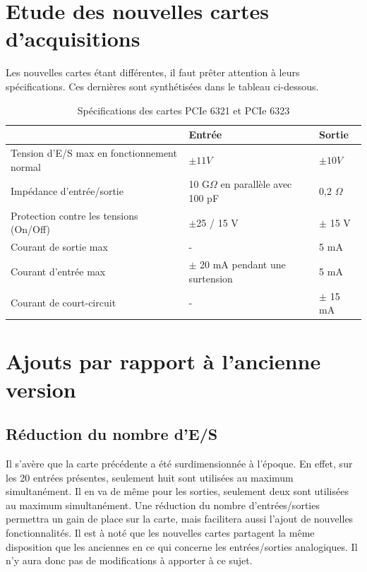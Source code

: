 \documentclass{report}
\begin{document}
\section{Etude des nouvelles cartes d'acquisitions}
Les nouvelles cartes étant différentes, il faut prêter attention à leurs spécifications. Ces dernières sont synthétisées dans le tableau ci-dessous.

\begin{table}[!h]
\begin{center}
\begin{tabular}{l|l|l|}
\cline{2-3}
                                                                 & Entrée                                & Sortie       \\ \hline
\multicolumn{1}{|l|}{Tension d'E/S max en fonctionnement normal} & $\pm 11 V$                            & $\pm 10 V$   \\ \hline
\multicolumn{1}{|l|}{Impédance d'entrée/sortie}                  & 10 G$\Omega$ en parallèle avec 100 pF & 0,2 $\Omega$ \\ \hline
\multicolumn{1}{|l|}{Protection contre les tensions (On/Off)}    & $\pm$25 / 15 V                        & $\pm$ 15 V   \\ \hline
\multicolumn{1}{|l|}{Courant de sortie max}                      & -                                     & 5 mA         \\ \hline
\multicolumn{1}{|l|}{Courant d'entrée max}                       & $\pm$ 20 mA pendant une surtension    & 5 mA         \\ \hline
\multicolumn{1}{|l|}{Courant de court-circuit}                   & -                                     & $\pm$ 15 mA  \\ \hline
\end{tabular}
\caption{Spécifications des cartes PCIe 6321 et PCIe 6323}
\end{center}
\end{table}

\section{Ajouts par rapport à l'ancienne version}
\subsection{Réduction du nombre d'E/S}
Il s'avère que la carte précédente a été surdimensionnée à l'époque. En effet, sur les 20 entrées présentes, seulement huit sont utilisées au maximum simultanément. Il en va de même pour les sorties, seulement deux sont utilisées au maximum simultanément. Une réduction du nombre d'entrées/sorties permettra un gain de place sur la carte, mais facilitera aussi l'ajout de nouvelles fonctionnalités. Il est à noté que les nouvelles cartes partagent la même disposition que les anciennes en ce qui concerne les entrées/sorties analogiques. Il n'y aura donc pas de modifications à apporter à ce sujet.
\end{document}
